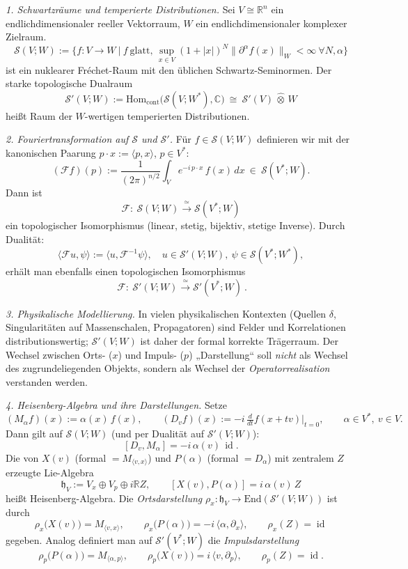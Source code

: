 \documentclass[10pt, letterpaper]{article}
\newcommand{\id}{\operatorname{id}}
\newcommand{\R}{\mathbb{R}}
\newcommand{\C}{\mathbb{C}}
\newcommand{\End}{\mathrm{End}}
\newcommand{\Hom}{\mathrm{Hom}}
\begin{document}
\bigskip

\emph{1. Schwartzräume und temperierte Distributionen.}
Sei \(V\cong\R^n\) ein endlichdimensionaler reeller Vektorraum, \(W\) ein endlichdimensionaler komplexer Zielraum.
\[
\mathcal{S}(V;W)
:= \big\{ f:V\!\to\! W \ \big|\ f\ \text{glatt, } \sup_{x\in V}(1+|x|)^N \|\partial^\alpha f(x)\|_W<\infty\ \forall N,\alpha\big\}
\]
ist ein nuklearer Fréchet-Raum mit den üblichen Schwartz-Seminormen. Der starke topologische Dualraum
\[
\mathcal{S}'(V;W)
:= \Hom_{\mathrm{cont}}\big(\mathcal{S}(V;W^\ast),\C\big)
\ \cong\ \mathcal{S}'(V)\,\widehat{\otimes}\,W
\]
heißt Raum der \(W\)-wertigen temperierten Distributionen.

\medskip

\emph{2. Fouriertransformation auf \(\mathcal{S}\) und \(\mathcal{S}'\).}
Für \(f\in\mathcal{S}(V;W)\) definieren wir mit der kanonischen Paarung \(p\!\cdot\! x:=\langle p,x\rangle\), \(p\in V^\ast\):
\[
(\mathcal{F}f)(p)
:= \frac{1}{(2\pi)^{n/2}}\int_V e^{-i\,p\cdot x}\,f(x)\,dx
\ \in\ \mathcal{S}(V^\ast;W).
\]
Dann ist
\[
\mathcal{F}:\ \mathcal{S}(V;W)\xrightarrow{\ \simeq\ } \mathcal{S}(V^\ast;W)
\]
ein topologischer Isomorphismus (linear, stetig, bijektiv, stetige Inverse). Durch Dualität:
\[
\langle \mathcal{F}u,\psi\rangle := \langle u,\mathcal{F}^{-1}\psi\rangle,
\quad u\in\mathcal{S}'(V;W),\ \psi\in\mathcal{S}(V^\ast;W^\ast),
\]
erhält man ebenfalls einen topologischen Isomorphismus
\[
\boxed{\ \mathcal{F}:\ \mathcal{S}'(V;W)\xrightarrow{\ \simeq\ }\mathcal{S}'(V^\ast;W)\ }.
\]

\medskip

\emph{3. Physikalische Modellierung.}
In vielen physikalischen Kontexten (Quellen \(\delta\), Singularitäten auf Massenschalen, Propagatoren) sind Felder und Korrelationen distributionswertig; \(\mathcal{S}'(V;W)\) ist daher der formal korrekte Trägerraum. Der Wechsel zwischen Orts- (\(x\)) und Impuls- (\(p\)) „Darstellung“ soll \emph{nicht} als Wechsel des zugrundeliegenden Objekts, sondern als Wechsel der \emph{Operatorrealisation} verstanden werden.

\bigskip

\emph{4. Heisenberg-Algebra und ihre Darstellungen.}
Setze
\[
(M_{\alpha}f)(x):=\alpha(x)\,f(x),\qquad
(D_v f)(x):=-i\,\tfrac{d}{dt}f(x+tv)\big|_{t=0},
\qquad \alpha\in V^\ast,\ v\in V.
\]
Dann gilt auf \(\mathcal{S}(V;W)\) (und per Dualität auf \(\mathcal{S}'(V;W)\)):
\[
[D_v, M_{\alpha}] = -i\,\alpha(v)\,\id.
\]
Die von \(X(v)\) (formal \(=M_{\langle v,x\rangle}\)) und \(P(\alpha)\) (formal \(=D_{\alpha}\)) mit zentralem \(Z\) erzeugte Lie-Algebra
\[
\mathfrak{h}_V := V_x\oplus V_p\oplus i\R Z,\qquad [X(v),P(\alpha)]=i\,\alpha(v)\,Z
\]
heißt Heisenberg-Algebra. Die \emph{Ortsdarstellung} \(\rho_x:\mathfrak{h}_V\to\End(\mathcal{S}'(V;W))\) ist durch
\[
\rho_x\big(X(v)\big) = M_{\langle v,x\rangle},\qquad
\rho_x\big(P(\alpha)\big) = -i\,\langle \alpha,\partial_x\rangle,\qquad
\rho_x(Z)=\id
\]
gegeben. Analog definiert man auf \(\mathcal{S}'(V^\ast;W)\) die \emph{Impulsdarstellung}
\[
\rho_p\big(P(\alpha)\big) = M_{\langle \alpha,p\rangle},\qquad
\rho_p\big(X(v)\big) = i\,\langle v,\partial_p\rangle,\qquad
\rho_p(Z)=\id.
\]
\end{document}

